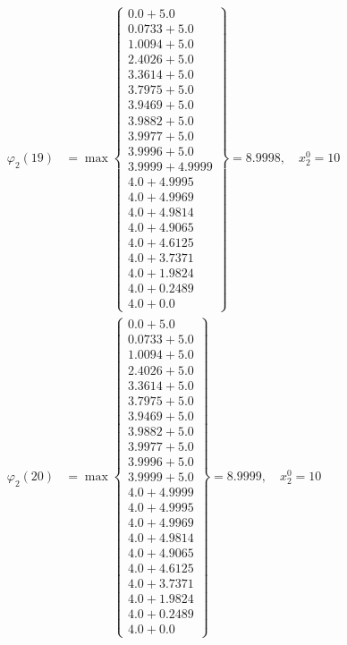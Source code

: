 \documentclass{article}
\begin{document}
\begin{align*}
  
\varphi_{2}(19) &= \max \left\{ \begin{array}{c}
0.0 + 5.0 \\
 0.0733 + 5.0 \\
 1.0094 + 5.0 \\
 2.4026 + 5.0 \\
 3.3614 + 5.0 \\
 3.7975 + 5.0 \\
 3.9469 + 5.0 \\
 3.9882 + 5.0 \\
 3.9977 + 5.0 \\
 3.9996 + 5.0 \\
 3.9999 + 4.9999 \\
 4.0 + 4.9995 \\
 4.0 + 4.9969 \\
 4.0 + 4.9814 \\
 4.0 + 4.9065 \\
 4.0 + 4.6125 \\
 4.0 + 3.7371 \\
 4.0 + 1.9824 \\
 4.0 + 0.2489 \\
 4.0 + 0.0
\end{array} \right\}=8.9998,\quad x_{2}^0=10\\
  
  
  
  
\varphi_{2}(20) &= \max \left\{ \begin{array}{c}
0.0 + 5.0 \\
 0.0733 + 5.0 \\
 1.0094 + 5.0 \\
 2.4026 + 5.0 \\
 3.3614 + 5.0 \\
 3.7975 + 5.0 \\
 3.9469 + 5.0 \\
 3.9882 + 5.0 \\
 3.9977 + 5.0 \\
 3.9996 + 5.0 \\
 3.9999 + 5.0 \\
 4.0 + 4.9999 \\
 4.0 + 4.9995 \\
 4.0 + 4.9969 \\
 4.0 + 4.9814 \\
 4.0 + 4.9065 \\
 4.0 + 4.6125 \\
 4.0 + 3.7371 \\
 4.0 + 1.9824 \\
 4.0 + 0.2489 \\
 4.0 + 0.0
\end{array} \right\}=8.9999,\quad x_{2}^0=10\\
  

\end{align*}
\end{document}
